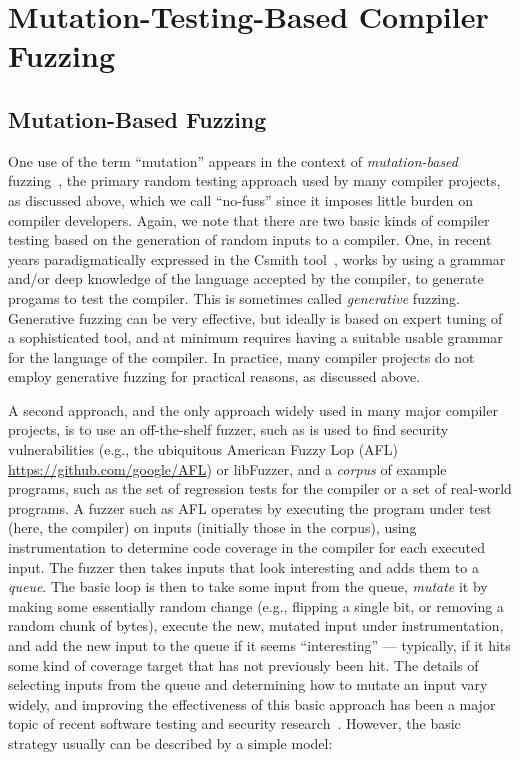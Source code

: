 \section{Mutation-Testing-Based Compiler Fuzzing}



\subsection{Mutation-Based Fuzzing}

One use of the term ``mutation'' appears in the context of \emph{mutation-based} fuzzing~\cite{ArtFuzz}, the primary random testing approach used by many compiler projects, as discussed above, which we call ``no-fuss'' since it imposes little burden on compiler developers.  Again, we note that there are two basic kinds of compiler testing based on the generation of random inputs to a compiler.  One, in recent years paradigmatically expressed in the Csmith tool~\cite{csmith}, works by using a grammar and/or deep knowledge of the language accepted by the compiler, to generate progams to test the compiler.  This is sometimes called \emph{generative} fuzzing.  Generative fuzzing can be very effective, but  ideally is based on expert tuning of a sophisticated tool, and at minimum requires having a suitable usable grammar for the language of the compiler.  In practice, many compiler projects do not employ generative fuzzing for practical reasons, as discussed above.

A second approach, and the only approach widely used in many major compiler projects, is to use an off-the-shelf fuzzer, such as is used to find security vulnerabilities (e.g., the ubiquitous American Fuzzy Lop (AFL) \url{https://github.com/google/AFL}) or libFuzzer, and a \emph{corpus} of example programs, such as the set of regression tests for the compiler or a set of real-world programs.  A fuzzer such as AFL operates by executing the program under test (here, the compiler) on inputs (initially those in the corpus), using instrumentation to determine code coverage in the compiler for each executed input.  The fuzzer then takes inputs that look interesting and adds them to a \emph{queue}.  The basic loop is then to take some input from the queue, \emph{mutate} it by making some essentially random change (e.g., flipping a single bit, or removing a random chunk of bytes), execute the new, mutated input under instrumentation, and add the new input to the queue if it seems ``interesting'' --- typically, if it hits some kind of coverage target that has not previously been hit.  The details of selecting inputs from the queue and determining how to mutate an input vary widely, and improving the effectiveness of this basic approach has been a major topic of recent software testing and security research~\cite{evalfuzz,BoehmeCR21,ArtFuzz}.  However, the basic strategy usually can be described by a simple model:

